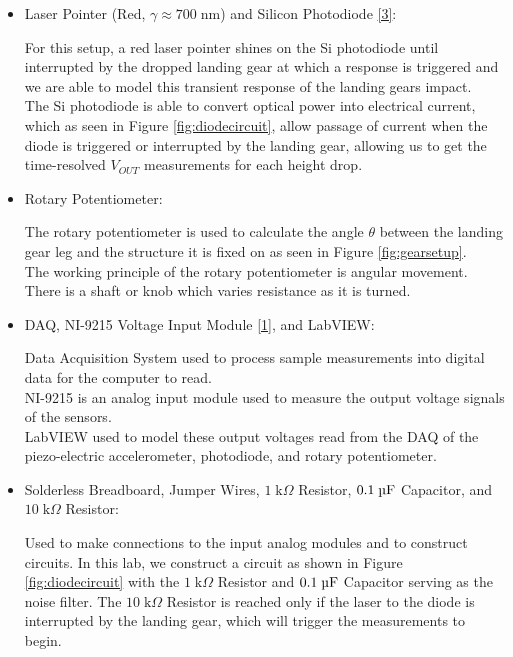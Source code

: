 \documentclass{article}
\begin{document}
\begin{itemize}
\item Laser Pointer (Red, $\gamma \approx 700\; \text{nm}$) and Silicon Photodiode \hyperlink{3}{[3]}:
\vspace{1mm}

For this setup, a red laser pointer shines on the Si photodiode until interrupted by the dropped landing gear at which a response is triggered and we are able to model this transient response of the landing gears impact.\\[1pt]
The Si photodiode is able to convert optical power into electrical current, which as seen in Figure \ref{fig:diodecircuit}, allow passage of current when the diode is triggered or interrupted by the landing gear, allowing us to get the time-resolved $V_{OUT}$ measurements for each height drop.
\vspace{2.5mm}

\item Rotary Potentiometer:
\vspace{1mm}

The rotary potentiometer is used to calculate the angle $\theta$ between the landing gear leg and the structure it is fixed on as seen in Figure \ref{fig:gearsetup}.\\[1pt] The working principle of the rotary potentiometer is angular movement. There is a shaft or knob which varies resistance as it is turned.

\vspace{2.5mm}

\item DAQ, NI-9215 Voltage Input Module \hyperlink{datasheets}{[1]},  and LabVIEW:
\vspace{1mm}

Data Acquisition System used to process sample measurements into digital data for the computer to read.\\[5pt]
NI-9215 is an analog input module used to measure the output voltage signals of the sensors.\\[5pt]
LabVIEW used to model these output voltages read from the DAQ of the piezo-electric accelerometer, photodiode, and rotary potentiometer.

\item Solderless Breadboard, Jumper Wires, $1\; \text{k}\Omega$ Resistor, $0.1\; \micro\text{F}$ Capacitor, and $10\; \text{k}\Omega$ Resistor: 
\vspace{1mm}

Used to make connections to the input analog modules and to construct circuits. In this lab, we construct a circuit as shown in Figure \ref{fig:diodecircuit} with the $1\; \text{k}\Omega$ Resistor and  $0.1\; \micro\text{F}$ Capacitor serving as the noise filter. The $10\; \text{k}\Omega$ Resistor is reached only if the laser to the diode is interrupted by the landing gear, which will trigger the measurements to begin.


\end{itemize}
\end{document}
